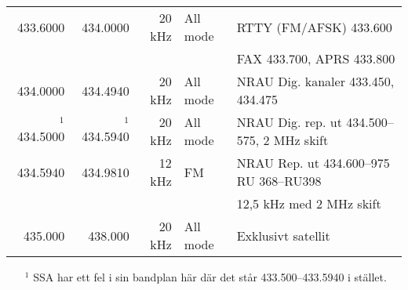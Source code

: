 \documentclass[10pt,swedish,a4paper]{article}
\begin{document}
\begin{landscape}
\begin{tabular}{rrrll}
	         433.6000 &      434.0000 &          20 kHz & All mode        & RTTY (FM/AFSK) 433.600                        \\
	                  &               &                 &                 & FAX 433.700, APRS 433.800                     \\ \hline
	         434.0000 &      434.4940 &          20 kHz & All mode        & NRAU Dig. kanaler 433.450, 434.475            \\ \hline
	    $^1$ 434.5000 & $^1$ 434.5940 &          20 kHz & All mode        & NRAU Dig. rep. ut 434.500--575, 2 MHz skift   \\ \hline
	         434.5940 &      434.9810 &          12 kHz & FM              & NRAU Rep. ut 434.600--975 RU 368--RU398       \\
	                  &               &                 &                 & 12,5 kHz med 2 MHz skift                      \\ \hline
	          435.000 &       438.000 &          20 kHz & All mode        & Exklusivt satellit                            \\ \hline
\end{tabular}
	\begin{itemize}
		\item[$^1$] SSA har ett fel i sin bandplan här där det står 433.500--433.5940 i stället.
	\end{itemize}
\end{landscape}
\end{document}
